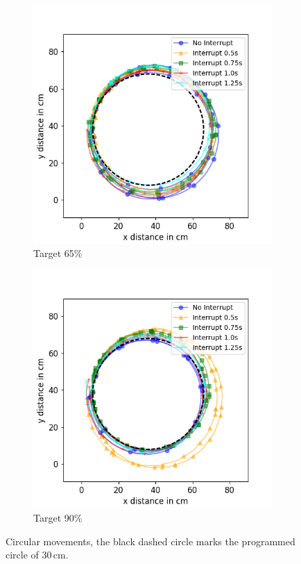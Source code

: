 \begin{figure}[h!]
\begin{subfigure}[b]{0.49\textwidth}
		\includegraphics[width=\textwidth]{pics/circle_65.png}
		\caption{Target 65\%}
		\label{fig:circ_exp2}
	\end{subfigure}

	\begin{subfigure}[b]{0.49\textwidth}
		\includegraphics[width=\textwidth]{pics/circle_90.png}
		\caption{Target 90\%}
		\label{fig:circ_exp3}
	\end{subfigure}
	\caption{Circular movements, the black dashed circle marks the programmed circle of 30\,cm.}
	\label{fig:circular_movements}
\end{figure}

